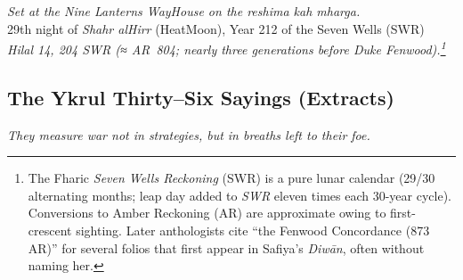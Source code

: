 \documentclass[11pt]{article}
\begin{document}
\begin{flushright}\small
\textit{Set at the Nine Lanterns Way\textendash House on the \emph{reshima kah mharga}.}\\
29th night of \emph{Shahr al\textendash Hirr} (Heat\textendash Moon), Year 212 of the Seven Wells (SWR)\\
	\textit{Hilal 14, 204 \textsc{SWR} (≈ AR~804; nearly three generations before Duke Fenwood).\footnote{The Fharic \emph{Seven Wells Reckoning} (SWR) is a pure lunar calendar (29/30 alternating months; leap day added to \emph{SWR} eleven times each 30-year cycle). Conversions to Amber Reckoning (AR) are approximate owing to first-crescent sighting. Later anthologists cite “the Fenwood Concordance (873 AR)” for several folios that first appear in Safiya’s \emph{Diwān}, often without naming her.}}
\end{flushright}

\clearpage

\subsection*{The Ykrul Thirty--Six Sayings \textnormal{(Extracts)}}
\noindent\emph{They measure war not in strategies, but in breaths left to their foe.}
\end{document}
